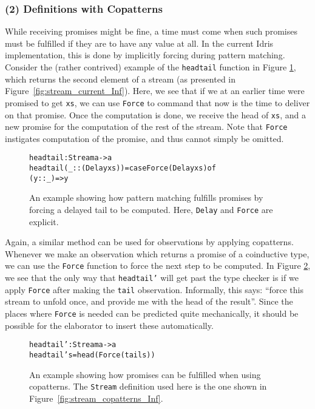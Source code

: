 \subsubsection{(2) Definitions with Copatterns} While receiving promises might be fine, a time must come when such promises must be fulfilled if they are to have any value at all. In the current Idris implementation, this is done by implicitly forcing during pattern matching. Consider the (rather contrived) example of the \texttt{headtail} function in Figure \ref{fig:headtail}, which returns the second element of a stream (as presented in Figure~\ref{fig:stream_current_Inf}). Here, we see that if we at an earlier time were promised to get \texttt{xs}, we can use \texttt{Force} to command that now is the time to deliver on that promise. Once the computation is done, we receive the head of \texttt{xs}, and a new promise for the computation of the rest of the stream. Note that \texttt{Force} instigates computation of the promise, and thus cannot simply be omitted.

\begin{figure}
\begin{alltt}
headtail : Stream a -> a
headtail (_ :: (Delay xs)) = case Force (Delay xs) of
                               (y :: _) => y
\end{alltt}
\caption{An example showing how pattern matching fulfills promises by forcing a delayed tail to be computed. Here, \texttt{Delay} and \texttt{Force} are explicit.}
\label{fig:headtail}
\end{figure}

Again, a similar method can be used for observations by applying copatterns. Whenever we make an observation which returns a promise of a coinductive type,
we can use the \texttt{Force} function to force the next step to be computed. In Figure \ref{fig:headtail_copatterns}, we see that the only way that \texttt{headtail'} will get past the type checker is if we apply \texttt{Force} after making the \texttt{tail} observation. Informally, this says: ``force this stream to unfold once, and provide me with the head of the result''. Since the places where \texttt{Force} is needed can be predicted quite mechanically, it should be possible for the elaborator to insert these automatically.

\begin{figure}
\begin{alltt}
headtail' : Stream a -> a
headtail' s = head (Force (tail s))
\end{alltt}
\caption{An example showing how promises can be fulfilled when using copatterns. The \texttt{Stream} definition used here is the one shown in Figure~\ref{fig:stream_copatterns_Inf}.}
\label{fig:headtail_copatterns}
\end{figure}

